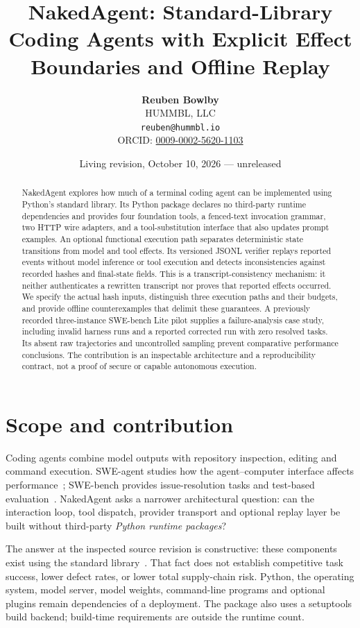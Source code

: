 \documentclass[10pt,twocolumn,letterpaper]{article}
\title{NakedAgent: Standard-Library Coding Agents with Explicit Effect Boundaries and Offline Replay}
\author{\textbf{Reuben Bowlby}\\HUMMBL, LLC\\\texttt{reuben@hummbl.io}\\
ORCID: \href{https://orcid.org/0009-0002-5620-1103}{0009-0002-5620-1103}}
\date{Living revision, October 10, 2026 --- unreleased}
\begin{document}
\maketitle
\begin{abstract}
NakedAgent explores how much of a terminal coding agent can be implemented using Python's standard library. Its Python package declares no third-party runtime dependencies and provides four foundation tools, a fenced-text invocation grammar, two HTTP wire adapters, and a tool-substitution interface that also updates prompt examples. An optional functional execution path separates deterministic state transitions from model and tool effects. Its versioned JSONL verifier replays reported events without model inference or tool execution and detects inconsistencies against recorded hashes and final-state fields. This is a transcript-consistency mechanism: it neither authenticates a rewritten transcript nor proves that reported effects occurred. We specify the actual hash inputs, distinguish three execution paths and their budgets, and provide offline counterexamples that delimit these guarantees. A previously recorded three-instance SWE-bench Lite pilot supplies a failure-analysis case study, including invalid harness runs and a reported corrected run with zero resolved tasks. Its absent raw trajectories and uncontrolled sampling prevent comparative performance conclusions. The contribution is an inspectable architecture and a reproducibility contract, not a proof of secure or capable autonomous execution.
\end{abstract}

\section{Scope and contribution}
Coding agents combine model outputs with repository inspection, editing and command execution. SWE-agent studies how the agent--computer interface affects performance~\cite{yang2024sweagent}; SWE-bench provides issue-resolution tasks and test-based evaluation~\cite{jimenez2024swebench}. NakedAgent asks a narrower architectural question: can the interaction loop, tool dispatch, provider transport and optional replay layer be built without third-party \emph{Python runtime packages}?

The answer at the inspected source revision is constructive: these components exist using the standard library~\cite{nakedagentsource}. That fact does not establish competitive task success, lower defect rates, or lower total supply-chain risk. Python, the operating system, model server, model weights, command-line programs and optional plugins remain dependencies of a deployment. The package also uses a setuptools build backend; build-time requirements are outside the runtime count.
\end{document}
